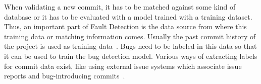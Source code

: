 When validating a new commit, it has to be matched against some kind of database or it has to be evaluated with a model trained with a training dataset. Thus, an important part of Fault Detection is the data source from where this training data or matching information comes. Usually the past commit history of the project is used as training data~\cite{Kamei2013}.
Bugs need to be labeled in this data so that it can be used to train the bug detection model.
Various ways
of extracting labels for commit data exist, like using external issue systems which associate issue reports and bug-introducing commits~\cite{Nayrolles2018,Rosen2015}.


